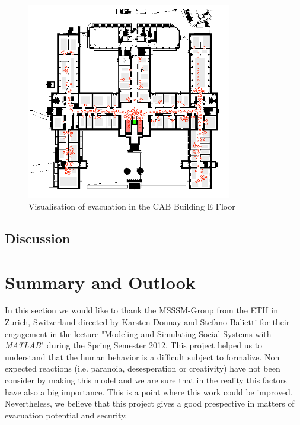 \documentclass[11pt]{article}
\begin{document}
\begin{figure}[h]
\centering
\includegraphics[width=0.8\textwidth]{./images/cab1.png}
\caption{Visualisation of evacuation in the CAB Building E Floor} 
\label{cab1}
\end{figure}




\subsection{Discussion}


\section{Summary and Outlook}

In this section we would like to thank the MSSSM-Group from the ETH in Zurich, Switzerland directed by Karsten Donnay and Stefano Balietti for their engagement in the lecture "Modeling and Simulating Social Systems with \textit{MATLAB}" during the Spring Semester 2012. This project helped us to understand that the human behavior is a difficult subject to formalize. Non expected reactions (i.e. paranoia, desesperation or creativity) have not been consider by making this model and we are sure that in the reality this factors have also a big importance. This is a point where this work could be improved. Nevertheless, we believe that this project gives a good prespective in matters of evacuation potential and security.


\end{document}
